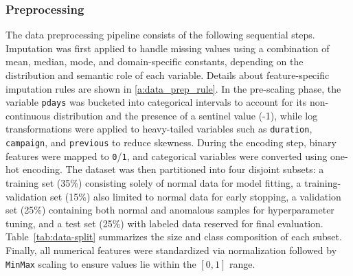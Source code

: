 \subsubsection{Preprocessing}

The data preprocessing pipeline consists of the following sequential steps. Imputation was first applied to handle missing values using a combination of mean, median, mode, and domain-specific constants, depending on the distribution and semantic role of each variable. Details about feature-specific imputation rules are shown in \ref{a:data_prep_rule}. In the pre-scaling phase, the variable \texttt{pdays} was bucketed into categorical intervals to account for its non-continuous distribution and the presence of a sentinel value (-1), while log transformations were applied to heavy-tailed variables such as \texttt{duration}, \texttt{campaign}, and \texttt{previous} to reduce skewness. During the encoding step, binary features were mapped to \texttt{0}/\texttt{1}, and categorical variables were converted using one-hot encoding. The dataset was then partitioned into four disjoint subsets: a training set (35\%) consisting solely of normal data for model fitting, a training-validation set (15\%) also limited to normal data for early stopping, a validation set (25\%) containing both normal and anomalous samples for hyperparameter tuning, and a test set (25\%) with labeled data reserved for final evaluation. Table~\ref{tab:data-split} summarizes the size and class composition of each subset. Finally, all numerical features were standardized via normalization followed by \texttt{MinMax} scaling to ensure values lie within the $[0, 1]$ range.






